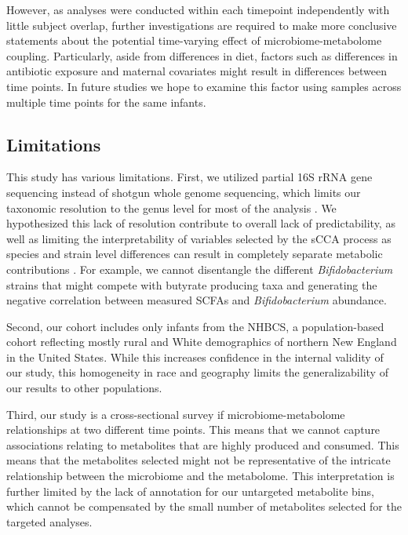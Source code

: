 However, as analyses were conducted within each timepoint independently with little subject overlap, further investigations are required to make more conclusive statements about the potential time-varying effect of microbiome-metabolome coupling. Particularly, aside from differences in diet, factors such as differences in antibiotic exposure \cite{coker2020specific} and maternal covariates \cite{lundgren2018maternal} might result in differences between time points. In future studies we hope to examine this factor using samples across multiple time points for the same infants.  

\subsection{Limitations}

This study has various limitations. First, we utilized partial 16S rRNA gene sequencing instead of shotgun whole genome sequencing, which limits our taxonomic resolution to the genus level for most of the analysis \cite{zhang2016strainlevel}. We hypothesized this lack of resolution contribute to overall lack of predictability, as well as limiting the interpretability of variables selected by the sCCA process as species and strain level differences can result in completely separate metabolic contributions \cite{lloyd-price2017strains}. For example, we cannot disentangle the different \emph{Bifidobacterium} strains that might compete with butyrate producing taxa and generating the negative correlation between measured SCFAs and \emph{Bifidobacterium} abundance.  

Second, our cohort includes only infants from the NHBCS, a population-based cohort reflecting mostly rural and White demographics of northern New England in the United States. While this increases confidence in the internal validity of our study, this homogeneity in race and geography limits the generalizability of our results to other populations. 

Third, our study is a cross-sectional survey if microbiome-metabolome relationships at two different time points. This means that we cannot capture associations relating to metabolites that are highly produced and consumed. This means that the metabolites selected might not be representative of the intricate relationship between the microbiome and the metabolome. This interpretation is further limited by the lack of annotation for our untargeted metabolite bins, which cannot be compensated by the small number of metabolites selected for the targeted analyses. 

